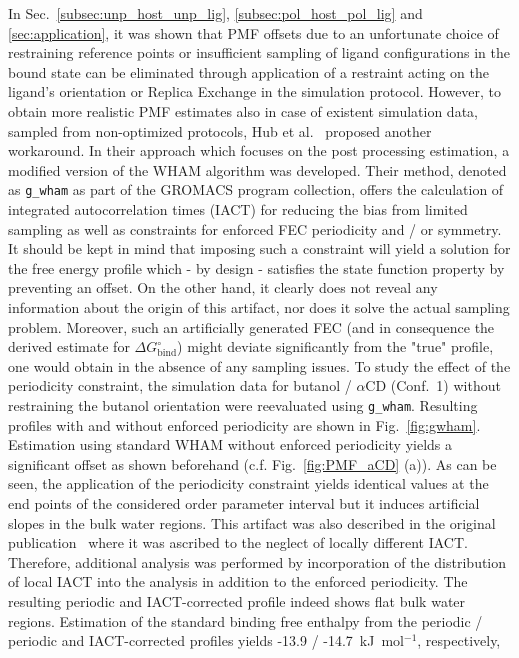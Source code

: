 \documentclass[9pt,lessons,pubversion]{livecoms}
\begin{document}
In Sec.~\ref{subsec:unp_host_unp_lig},  \ref{subsec:pol_host_pol_lig}  and \ref{sec:application}, it was shown that PMF offsets due to an unfortunate choice of restraining reference points or insufficient sampling of ligand configurations in the bound state can be eliminated through application of a restraint acting on the ligand's orientation or Replica Exchange in the simulation protocol. 
However, to obtain more realistic PMF estimates also in case of existent simulation data, sampled from non-optimized protocols, Hub et al.~\cite{hub2010g_wham} proposed another workaround. 
In their approach which focuses on the post processing estimation, a modified version of the WHAM algorithm was developed.
Their method, denoted as \texttt{g\_wham} as part of the GROMACS program collection, offers the calculation of integrated autocorrelation times (IACT) for reducing the bias from limited sampling as well as constraints for enforced FEC periodicity and / or symmetry.
It should be kept in mind that imposing such a constraint will yield a solution for the free energy profile which - by design - satisfies the state function property by preventing an offset. 
On the other hand, it clearly does not reveal any information about the origin of this artifact, nor does it solve the actual sampling problem.
Moreover, such an artificially generated FEC (and in consequence the derived estimate for $\Delta G^\circ_\mathrm{bind}$) might deviate significantly from the "true" profile, 
one would obtain in the absence of any sampling issues. 
To study the effect of the periodicity constraint, the simulation data for butanol /  $\alpha$CD (Conf.~1) without restraining the butanol orientation were reevaluated using \texttt{g\_wham}.
Resulting profiles with and without enforced periodicity are shown in Fig.~\ref{fig:gwham}. 
Estimation using standard WHAM  without enforced periodicity yields a significant offset as shown beforehand (c.f. Fig.~\ref{fig:PMF_aCD} (a)).
As can be seen, the application of the periodicity constraint yields identical values at the end points of the considered order parameter interval but it induces artificial slopes in the bulk water regions.
This artifact was also described in the original publication~\cite{hub2010g_wham} where it was ascribed to the neglect of locally different IACT.
Therefore, additional analysis was performed by incorporation of the distribution of local IACT into the analysis in addition to the enforced periodicity.
The resulting periodic and IACT-corrected profile indeed shows flat bulk water regions. 
Estimation of the standard binding free enthalpy from the periodic / periodic and IACT-corrected profiles yields -13.9 / -14.7~kJ~mol$^{-1}$, respectively, 
\end{document}
